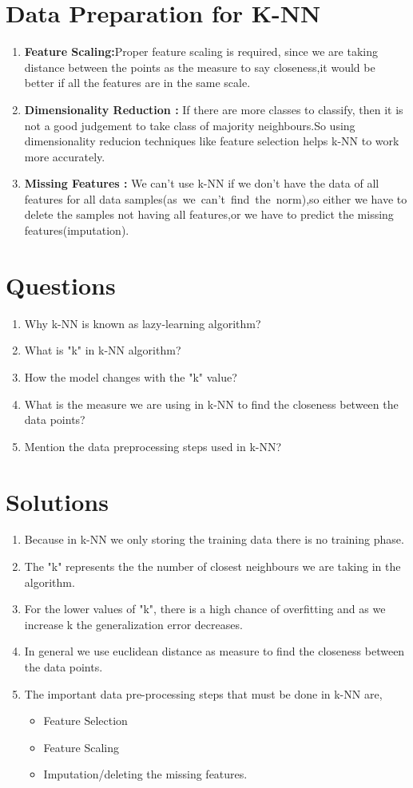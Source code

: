 \documentclass[journal,12pt,onecolumn]{IEEEtran}
\theoremstyle{remark}
\numberwithin{equation}{section}
\begin{document}
	       \section{Data Preparation for K-NN}
	        \begin{enumerate}
		 \item \textbf{Feature Scaling:}Proper feature scaling is required, since we are taking distance between the points as the measure to say closeness,it would be better if all the features are in the same scale.
		 \item \textbf{Dimensionality Reduction :} If there are more classes to classify, then it is not a good judgement to take class of majority neighbours.So using dimensionality reducion techniques like feature selection helps k-NN to work more accurately.
	         \item \textbf{Missing Features :} We can't use k-NN if we don't have the data of all features for all data samples(as\, we\, can't\, find\, the\, norm),so either we have to delete the samples not having all features,or we have to predict the missing features(imputation).
		\end{enumerate}
	       \section{Questions}
	        \begin{enumerate}
		 \item Why k-NN is known as lazy-learning algorithm?
		 \item What is "k" in k-NN algorithm?
		 \item How the model changes with the "k" value?
		 \item What is the measure we are using in k-NN to find the closeness between the data points?
		 \item Mention the data preprocessing steps used in k-NN?
	        \end{enumerate}
	       \section{Solutions}
	        \begin{enumerate}
		 \item Because in k-NN we only storing the training data there is no training phase.
		 \item The "k" represents the the number of closest neighbours we are taking in the algorithm.
		 \item For the lower values of "k", there is a high chance of overfitting and as we increase k the generalization error decreases.
		 \item In general we use euclidean distance as measure to find the closeness between the data points.
		 \item The important data pre-processing steps that must be done in k-NN are,
			  \begin{itemize}
			    \item Feature Selection
			    \item Feature Scaling
			    \item Imputation/deleting the missing features.
			  \end{itemize}
		\end{enumerate}
         
\end{document}
